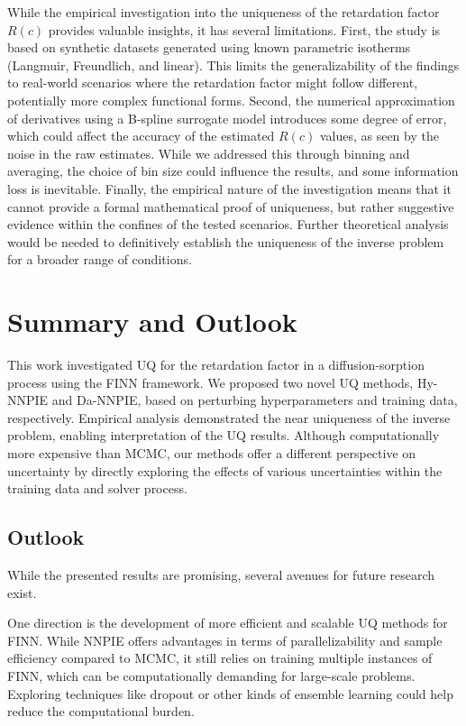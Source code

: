 While the empirical investigation into the uniqueness of the retardation factor $R(c)$ provides valuable insights, it has several limitations. First, the study is based on synthetic datasets generated using known parametric isotherms (Langmuir, Freundlich, and linear). This limits the generalizability of the findings to real-world scenarios where the retardation factor might follow different, potentially more complex functional forms. Second, the numerical approximation of derivatives using a B-spline surrogate model introduces some degree of error, which could affect the accuracy of the estimated $R(c)$ values, as seen by the noise in the raw estimates. While we addressed this through binning and averaging, the choice of bin size could influence the results, and some information loss is inevitable. Finally, the empirical nature of the investigation means that it cannot provide a formal mathematical proof of uniqueness, but rather suggestive evidence within the confines of the tested scenarios. Further theoretical analysis would be needed to definitively establish the uniqueness of the inverse problem for a broader range of conditions.


\section{Summary and Outlook}
This work investigated UQ for the retardation factor in a diffusion-sorption process using the FINN framework. We proposed two novel UQ methods, Hy-NNPIE and Da-NNPIE, based on perturbing hyperparameters and training data, respectively. Empirical analysis demonstrated the near uniqueness of the inverse problem, enabling interpretation of the UQ results. Although computationally more expensive than MCMC, our methods offer a different perspective on uncertainty by directly exploring the effects of various uncertainties within the training data and solver process.


\subsection{Outlook}
While the presented results are promising, several avenues for future research exist.

One direction is the development of more efficient and scalable UQ methods for FINN. While NNPIE offers advantages in terms of parallelizability and sample efficiency compared to MCMC, it still relies on training multiple instances of FINN, which can be computationally demanding for large-scale problems. Exploring techniques like dropout or other kinds of ensemble learning could help reduce the computational burden.


